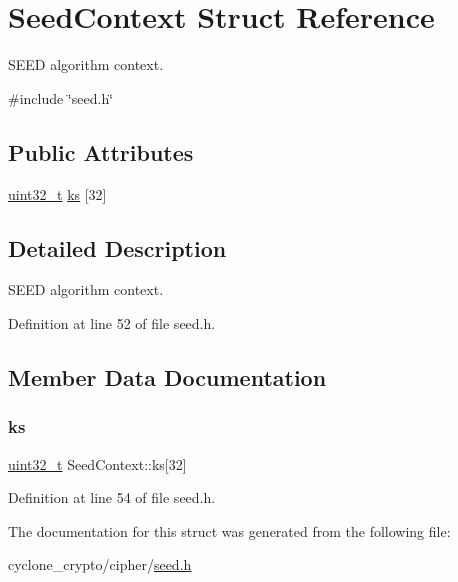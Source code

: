 \hypertarget{structSeedContext}{}\section{Seed\+Context Struct Reference}
\label{structSeedContext}


S\+E\+ED algorithm context.  




{\ttfamily \#include \char`\"{}seed.\+h\char`\"{}}

\subsection*{Public Attributes}
\begin{DoxyCompactItemize}
\item 
\hyperlink{stdint_8h_a435d1572bf3f880d55459d9805097f62}{uint32\+\_\+t} \hyperlink{structSeedContext_a57b22972db1ea196738315940ca47f1e}{ks} \mbox{[}32\mbox{]}
\end{DoxyCompactItemize}


\subsection{Detailed Description}
S\+E\+ED algorithm context. 

Definition at line 52 of file seed.\+h.



\subsection{Member Data Documentation}
\mbox{\label{structSeedContext_a57b22972db1ea196738315940ca47f1e}} 
\subsubsection{\texorpdfstring{ks}{ks}}
{\footnotesize\ttfamily \hyperlink{stdint_8h_a435d1572bf3f880d55459d9805097f62}{uint32\+\_\+t} Seed\+Context\+::ks\mbox{[}32\mbox{]}}



Definition at line 54 of file seed.\+h.



The documentation for this struct was generated from the following file\+:\begin{DoxyCompactItemize}
\item 
cyclone\+\_\+crypto/cipher/\hyperlink{seed_8h}{seed.\+h}\end{DoxyCompactItemize}
